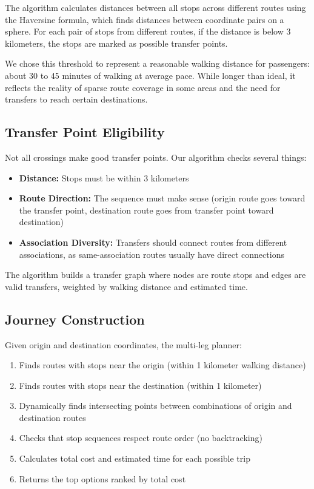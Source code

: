 \documentclass[a4paper,12pt]{article}
\begin{document}
The algorithm calculates distances between all stops across different routes using the Haversine formula, which finds distances between coordinate pairs on a sphere. For each pair of stops from different routes, if the distance is below 3 kilometers, the stops are marked as possible transfer points.

We chose this threshold to represent a reasonable walking distance for passengers: about 30 to 45 minutes of walking at average pace. While longer than ideal, it reflects the reality of sparse route coverage in some areas and the need for transfers to reach certain destinations.

\subsection{Transfer Point Eligibility}
Not all crossings make good transfer points. Our algorithm checks several things:

\begin{itemize}
\item \textbf{Distance:} Stops must be within 3 kilometers
\item \textbf{Route Direction:} The sequence must make sense (origin route goes toward the transfer point, destination route goes from transfer point toward destination)
\item \textbf{Association Diversity:} Transfers should connect routes from different associations, as same-association routes usually have direct connections
\end{itemize}

The algorithm builds a transfer graph where nodes are route stops and edges are valid transfers, weighted by walking distance and estimated time.

\subsection{Journey Construction}
Given origin and destination coordinates, the multi-leg planner:

\begin{enumerate}
\item Finds routes with stops near the origin (within 1 kilometer walking distance)
\item Finds routes with stops near the destination (within 1 kilometer)
\item Dynamically finds intersecting points between combinations of origin and destination routes 
\item Checks that stop sequences respect route order (no backtracking)
\item Calculates total cost and estimated time for each possible trip
\item Returns the top options ranked by total cost
\end{enumerate}
\end{document}
